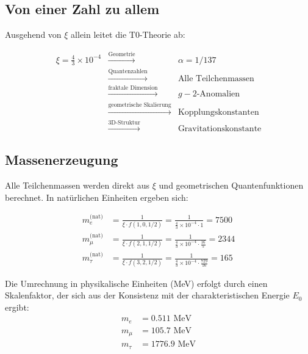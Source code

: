 	\subsection{Von einer Zahl zu allem}
	
	Ausgehend von $\xi$ allein leitet die T0-Theorie ab:
	
	\begin{equation}
		\begin{array}{rcl}
			\xi = \frac{4}{3} \times 10^{-4} & \xrightarrow{\text{Geometrie}} & \alpha = 1/137\\
			& \xrightarrow{\text{Quantenzahlen}} & \text{Alle Teilchenmassen}\\
			& \xrightarrow{\text{fraktale Dimension}} & g-2\text{-Anomalien}\\
			& \xrightarrow{\text{geometrische Skalierung}} & \text{Kopplungskonstanten}\\
			& \xrightarrow{\text{3D-Struktur}} & \text{Gravitationskonstante}
		\end{array}
	\end{equation}
	
	\subsection{Massenerzeugung}
	
	Alle Teilchenmassen werden direkt aus $\xi$ und geometrischen Quantenfunktionen berechnet. In natürlichen Einheiten ergeben sich:
	
	\begin{align}
		m_e^{\text{(nat)}} &= \frac{1}{\xi \cdot f(1,0,1/2)} = \frac{1}{\frac{4}{3} \times 10^{-4} \cdot 1} = 7500 \\
		m_\mu^{\text{(nat)}} &= \frac{1}{\xi \cdot f(2,1,1/2)} = \frac{1}{\frac{4}{3} \times 10^{-4} \cdot \frac{16}{5}} = 2344 \\
		m_\tau^{\text{(nat)}} &= \frac{1}{\xi \cdot f(3,2,1/2)} = \frac{1}{\frac{4}{3} \times 10^{-4} \cdot \frac{729}{16}} = 165
	\end{align}
	
	Die Umrechnung in physikalische Einheiten (MeV) erfolgt durch einen Skalenfaktor, der sich aus der Konsistenz mit der charakteristischen Energie $E_0$ ergibt:
	\begin{align}
		m_e &= 0.511 \text{ MeV} \\
		m_\mu &= 105.7 \text{ MeV} \\
		m_\tau &= 1776.9 \text{ MeV}
	\end{align}
	
